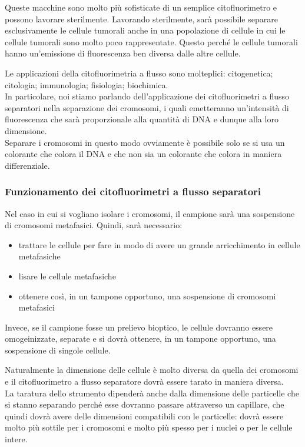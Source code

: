 \documentclass[11pt]{book}
\begin{document}
Queste macchine sono molto più sofisticate di un semplice citofluorimetro e possono lavorare sterilmente.
Lavorando sterilmente, sarà possibile separare esclusivamente le cellule tumorali anche in una popolazione di cellule in cui le cellule tumorali sono molto poco rappresentate.
Questo perché le cellule tumorali hanno un’emissione di fluorescenza ben diversa dalle altre cellule.

Le applicazioni della citofluorimetria a flusso sono molteplici: citogenetica; citologia; immunologia; fisiologia; biochimica.\\
In particolare, noi stiamo parlando dell’applicazione dei citofluorimetri a flusso separatori nella separazione dei cromosomi, i quali emetteranno un'intensità di fluorescenza che sarà proporzionale alla quantità di DNA e dunque alla loro dimensione.\\
Separare i cromosomi in questo modo ovviamente è possibile solo se si usa un colorante che colora il DNA e che non sia un colorante che colora in maniera differenziale.

\subsubsection{Funzionamento dei citofluorimetri a flusso separatori}

Nel caso in cui si vogliano isolare i cromosomi, il campione sarà una sospensione di cromosomi metafasici.
Quindi, sarà necessario:
\begin{itemize}
\item trattare le cellule per fare in modo di avere un grande arricchimento in cellule metafasiche
\item lisare le cellule metafasiche
\item ottenere così, in un tampone opportuno, una sospensione di cromosomi metafasici
\end{itemize}

Invece, se il campione fosse un prelievo bioptico, le cellule dovranno essere omogeinizzate, separate e si dovrà ottenere, in un tampone opportuno, una sospensione di singole cellule.

Naturalmente la dimensione delle cellule è molto diversa da quella dei cromosomi e il citofluorimetro a flusso separatore dovrà essere tarato in maniera diversa.\\
La taratura dello strumento dipenderà anche dalla dimensione delle particelle che si stanno separando perché esse dovranno passare attraverso un capillare, che quindi dovrà avere delle dimensioni compatibili con le particelle: dovrà essere molto più sottile per i cromosomi e molto più spesso per i nuclei o per le cellule intere.
\end{document}

